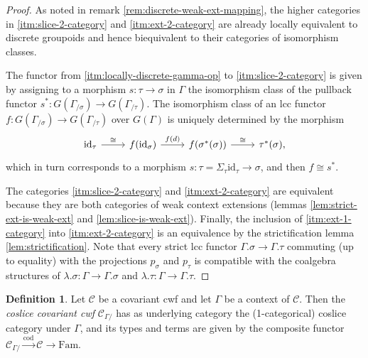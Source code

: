 \documentclass[a4paper]{article}
\theoremstyle{remark}
\theoremstyle{definition}
\newtheorem{definition}[theorem]{Definition}
\begin{document}
\begin{proof}
  As noted in remark \ref{rem:discrete-weak-ext-mapping}, the higher categories in \ref{itm:slice-2-category} and \ref{itm:ext-2-category} are already locally equivalent to discrete groupoids and hence biequivalent to their categories of isomorphism classes.

  The functor from \ref{itm:locally-discrete-gamma-op} to \ref{itm:slice-2-category} is given by assigning to a morphism $s : \tau \rightarrow \sigma$ in $\Gamma$ the isomorphism class of the pullback functor $s^* : G(\Gamma_{/ \sigma}) \rightarrow G(\Gamma_{/ \tau})$.
  The isomorphism class of an lcc functor $f : G(\Gamma_{/ \sigma}) \rightarrow G(\Gamma_{/ \tau})$ over $G(\Gamma)$ is uniquely determined by the morphism
  \begin{equation}
    \begin{tikzcd}
      \mathrm{id}_\tau \arrow[r, "\cong"] & f(\mathrm{id}_\sigma) \arrow[r, "f(d)"] & f(\sigma^*(\sigma)) \arrow[r, "\cong"] & \tau^*(\sigma),
    \end{tikzcd}
  \end{equation}
  which in turn corresponds to a morphism $s : \tau = \Sigma_\tau \mathrm{id}_\tau \rightarrow \sigma$, and then $f \cong s^*$.

  The categories \ref{itm:slice-2-category} and \ref{itm:ext-2-category} are equivalent because they are both categories of weak context extensions (lemmas \ref{lem:strict-ext-is-weak-ext} and \ref{lem:slice-is-weak-ext}).
  Finally, the inclusion of \ref{itm:ext-1-category} into \ref{itm:ext-2-category} is an equivalence by the strictification lemma \ref{lem:strictification}.
  Note that every strict lcc functor $\Gamma.\sigma \rightarrow \Gamma.\tau$ commuting (up to equality) with the projections $p_\sigma$ and $p_\tau$ is compatible with the coalgebra structures of $\lambda.\sigma : \Gamma \rightarrow \Gamma.\sigma$ and $\lambda.\tau : \Gamma \rightarrow \Gamma.\tau$.
\end{proof}

\begin{definition}
  Let $\mathcal{C}$ be a covariant cwf and let $\Gamma$ be a context of $ \mathcal{C}$.
  Then the \emph{coslice covariant cwf} $\mathcal{C}_{\Gamma /}$ has as underlying category the (1-categorical) coslice category under $\Gamma$, and its types and terms are given by the composite functor $\mathcal{C}_{\Gamma /} \xrightarrow{\mathrm{cod}} \mathcal{C} \rightarrow \mathrm{Fam}$.
\end{definition}
\end{document}
